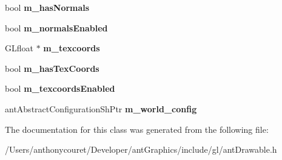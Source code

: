 \begin{DoxyCompactItemize}
\item 
\hypertarget{classant_drawable_a34f05f633360395ad6f9d8c524b92737}{bool {\bfseries m\+\_\+has\+Normals}}\label{classant_drawable_a34f05f633360395ad6f9d8c524b92737}

\item 
\hypertarget{classant_drawable_a77369a2341dcf92011260f57f5d86aec}{bool {\bfseries m\+\_\+normals\+Enabled}}\label{classant_drawable_a77369a2341dcf92011260f57f5d86aec}

\item 
\hypertarget{classant_drawable_af1cb237b3861412af1e8ec5519b36d73}{G\+Lfloat $\ast$ {\bfseries m\+\_\+texcoords}}\label{classant_drawable_af1cb237b3861412af1e8ec5519b36d73}

\item 
\hypertarget{classant_drawable_ab8dfeca134b6d453375cc86f17962d39}{bool {\bfseries m\+\_\+has\+Tex\+Coords}}\label{classant_drawable_ab8dfeca134b6d453375cc86f17962d39}

\item 
\hypertarget{classant_drawable_a7fa69da9f4ceb1134858b561521b16fd}{bool {\bfseries m\+\_\+texcoords\+Enabled}}\label{classant_drawable_a7fa69da9f4ceb1134858b561521b16fd}

\item 
\hypertarget{classant_drawable_ae908895d71cb02b45430e1c0cadaae5b}{ant\+Abstract\+Configuration\+Sh\+Ptr {\bfseries m\+\_\+world\+\_\+config}}\label{classant_drawable_ae908895d71cb02b45430e1c0cadaae5b}

\end{DoxyCompactItemize}


The documentation for this class was generated from the following file\+:\begin{DoxyCompactItemize}
\item 
/\+Users/anthonycouret/\+Developer/ant\+Graphics/include/gl/ant\+Drawable.\+h\end{DoxyCompactItemize}
